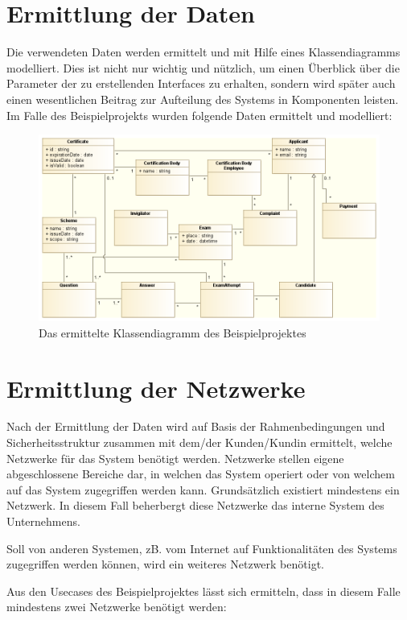 \section{Ermittlung der Daten}
Die verwendeten Daten werden ermittelt und mit Hilfe eines Klassendiagramms modelliert. Dies ist nicht nur wichtig und nützlich, um einen Überblick über die Parameter der zu erstellenden Interfaces zu erhalten, sondern wird später auch einen wesentlichen Beitrag zur Aufteilung des Systems in Komponenten leisten. Im Falle des Beispielprojekts wurden folgende Daten ermittelt und modelliert:

\begin{figure}[H]
    \centering
    \includegraphics[scale=0.5]{uml/class.png}
    \caption{Das ermittelte Klassendiagramm des Beispielprojektes}
\end{figure}

\section{Ermittlung der Netzwerke}
Nach der Ermittlung der Daten wird auf Basis der Rahmenbedingungen und Sicherheitsstruktur zusammen mit dem/der Kunden/Kundin ermittelt, welche Netzwerke für das System benötigt werden. Netzwerke stellen eigene abgeschlossene Bereiche dar, in welchen das System operiert oder von welchem auf das System zugegriffen werden kann. Grundsätzlich existiert mindestens ein Netzwerk. In diesem Fall beherbergt diese Netzwerke das interne System des Unternehmens.

Soll von anderen Systemen, zB. vom Internet auf Funktionalitäten des Systems zugegriffen werden können, wird ein weiteres Netzwerk benötigt.

Aus den Usecases des Beispielprojektes lässt sich ermitteln, dass in diesem Falle mindestens zwei Netzwerke benötigt werden:

